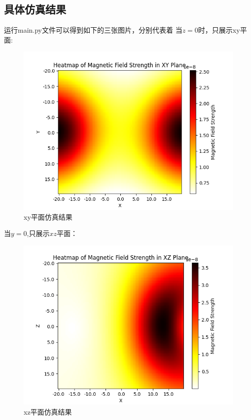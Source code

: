 \documentclass{article}
\begin{document}
\subsection{具体仿真结果}
运行main.py文件可以得到如下的三张图片，分别代表着
当$z = 0$时，只展示xy平面:

\begin{figure}[h]
  \centering
  \includegraphics[scale=0.35]{results/result1.png}
  \caption{xy平面仿真结果}
  \label{fig:example}
\end{figure}

当$y=0$,只展示$xz$平面：

\begin{figure}[h]
  \centering
  \includegraphics[scale=0.35]{results/result2.png}
  \caption{xz平面仿真结果}
  \label{fig:example}
\end{figure}
\end{document}
